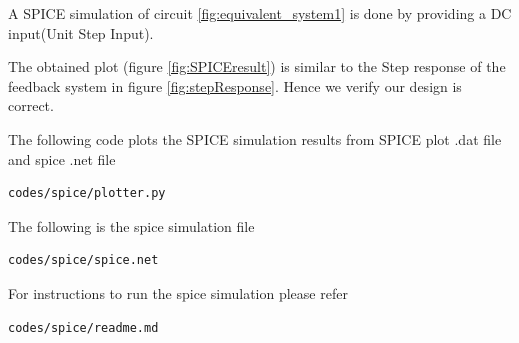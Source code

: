 \begin{enumerate}[label=\thesection.\arabic*.,ref=\thesection.\theenumi]
A SPICE simulation of circuit \ref{fig:equivalent_system1} is done by providing a DC input(Unit Step Input). 

The obtained plot (figure \ref{fig:SPICEresult}) is similar to the Step response of the feedback system in figure \ref{fig:stepResponse}. Hence we verify our design is correct.


The following code plots the SPICE simulation results
from SPICE plot .dat file and spice .net file

\begin{lstlisting}
codes/spice/plotter.py
\end{lstlisting}

The following is the spice simulation file

\begin{lstlisting}
codes/spice/spice.net
\end{lstlisting}

For instructions to run the spice simulation please refer

\begin{lstlisting}
codes/spice/readme.md
\end{lstlisting}
\end{enumerate}
